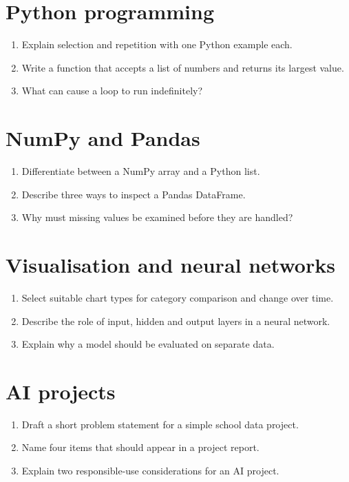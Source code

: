 \documentclass[11pt,openany,oneside]{book}
\begin{document}
\section*{Python programming}
\begin{enumerate}
\item Explain selection and repetition with one Python example each.
\item Write a function that accepts a list of numbers and returns its largest value.
\item What can cause a loop to run indefinitely?
\end{enumerate}
\section*{NumPy and Pandas}
\begin{enumerate}
\item Differentiate between a NumPy array and a Python list.
\item Describe three ways to inspect a Pandas DataFrame.
\item Why must missing values be examined before they are handled?
\end{enumerate}
\section*{Visualisation and neural networks}
\begin{enumerate}
\item Select suitable chart types for category comparison and change over time.
\item Describe the role of input, hidden and output layers in a neural network.
\item Explain why a model should be evaluated on separate data.
\end{enumerate}
\section*{AI projects}
\begin{enumerate}
\item Draft a short problem statement for a simple school data project.
\item Name four items that should appear in a project report.
\item Explain two responsible-use considerations for an AI project.
\end{enumerate}
\end{document}
